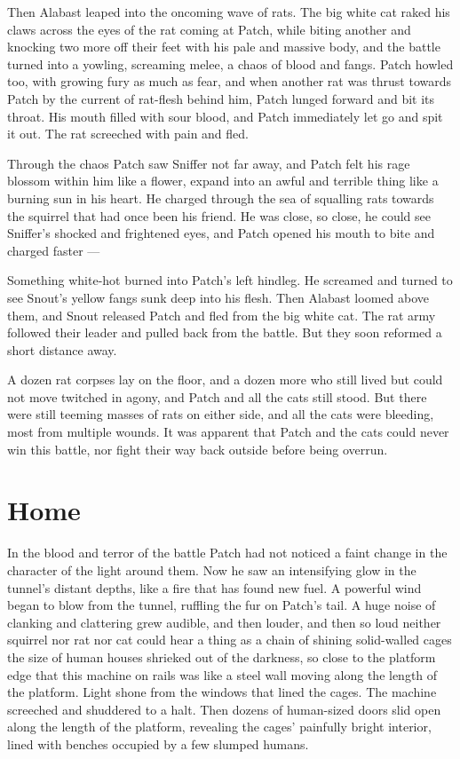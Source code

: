 \documentclass[ebook,oneside,openany,17pt]{memoir}
\newenvironment{tolerant}[1]{%
  \par\tolerance=#1\relax
}{%
  \par
}
\renewcommand{\thechapter}{\Roman{chapter}}
\newcounter{sections}
\newcommand{\sections}[1]{%
  \section*{#1}
  \addtocounter{sections}{1}%
  \pdfbookmark[1]{#1}{section.\thechapter.\thesections}}
\begin{document}
Then Alabast leaped into the oncoming wave of rats. The big white cat
raked his claws across the eyes of the rat coming at Patch, while
biting another and knocking two more off their feet with his pale and
massive body, and the battle turned into a yowling, screaming melee, a
chaos of blood and fangs. Patch howled too, with growing fury as much
as fear, and when another rat was thrust towards Patch by the current
of rat-flesh behind him, Patch lunged forward and bit its throat. His
mouth filled with sour blood, and Patch immediately let go and spit it
out. The rat screeched with pain and fled.

Through the chaos Patch saw Sniffer not far away, and Patch felt his
rage blossom within him like a flower, expand into an awful and
terrible thing like a burning sun in his heart. He charged through the
sea of squalling rats towards the squirrel that had once been his
friend. He was close, so close, he could see Sniffer’s shocked and
frightened eyes, and Patch opened his mouth to bite and charged faster
—

\begin{tolerant}{1000}
Something white-hot burned into Patch’s left hindleg. He screamed and
turned to see Snout’s yellow fangs sunk deep into his flesh. Then
Alabast loomed above them, and Snout released Patch and fled from the
big white cat. The rat army followed their leader and pulled back from
the battle. But they soon reformed a short distance away.
\end{tolerant}

A dozen rat corpses lay on the floor, and a dozen more who still lived
but could not move twitched in agony, and Patch and all the cats still
stood. But there were still teeming masses of rats on either side, and
all the cats were bleeding, most from multiple wounds. It was apparent
that Patch and the cats could never win this battle, nor fight their
way back outside before being overrun.


\sections{Home}

\begin{tolerant}{1000}
In the blood and terror of the battle Patch had not noticed a faint
change in the character of the light around them. Now he saw an
intensifying glow in the tunnel’s distant depths, like a fire that has
found new fuel. A powerful wind began to blow from the tunnel,
ruffling the fur on Patch’s tail. A huge noise of clanking and
clattering grew audible, and then louder, and then so loud neither
squirrel nor rat nor cat could hear a thing as a chain of shining
solid-walled cages the size of human houses shrieked out of the
darkness, so close to the platform edge that this machine on rails was
like a steel wall moving along the length of the platform. Light shone
from the windows that lined the cages. The machine screeched and
shuddered to a halt. Then dozens of human-sized doors slid open along
the length of the platform, revealing the cages’ painfully bright
interior, lined with benches occupied by a few slumped humans.
\end{tolerant}
\end{document}
